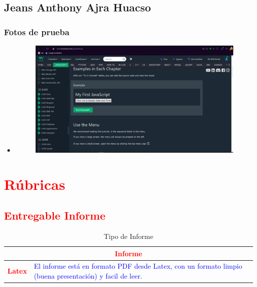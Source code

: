 \documentclass{article}
\begin{document}
	\subsection{Jeans Anthony Ajra Huacso}
	\subsubsection{Fotos de prueba}
	\begin{itemize}
		\item \begin{figure}[H]
			\centering
			\includegraphics[width=1.0\textwidth,keepaspectratio]{img/wsLuis.jpg}
		\end{figure}
	\end{itemize}







\clearpage

	\section{\textcolor{red}{Rúbricas}}
	
	\subsection{\textcolor{red}{Entregable Informe}}
	\begin{table}[H]
		\caption{Tipo de Informe}
		\setlength{\tabcolsep}{0.5em} %
		{\renewcommand{\arraystretch}{1.5}%
		\begin{tabular}{|p{3cm}|p{12cm}|}
			\hline
			\multicolumn{2}{|c|}{\textbf{\textcolor{red}{Informe}}}  \\
			\hline 
			\textbf{\textcolor{red}{Latex}} & \textcolor{blue}{El informe está en formato PDF desde Latex,  con un formato limpio (buena presentación) y facil de leer.}   \\ 
			\hline 
			
			
		\end{tabular}
	}
	\end{table}
	
\end{document}
